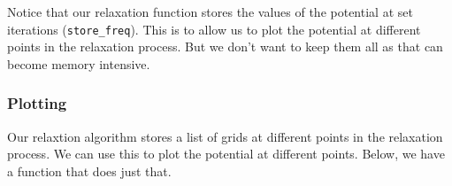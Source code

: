 Notice that our relaxation function stores the values of the potential
at set iterations (\texttt{store\_freq}). This is to allow us to plot
the potential at different points in the relaxation process. But we
don't want to keep them all as that can become memory intensive.

\begin{Shaded}
\begin{Highlighting}[]

\OperatorTok{=}\NormalTok{):}
\OperatorTok{=}\NormalTok{ []}
    
     
         \NormalTok{(}\NormalTok{, }\OperatorTok{{-}}\NormalTok{):}
\OperatorTok{=}  \OperatorTok{*}\NormalTok{ (grid[j}\OperatorTok{{-}}\NormalTok{] }\OperatorTok{+}\NormalTok{ grid[j}\OperatorTok{+}\NormalTok{])}
        
        \OperatorTok{\%}\OperatorTok{==} \NormalTok{:}
    
\end{Highlighting}
\end{Shaded}

\subsubsection{Plotting}\label{plotting}

Our relaxtion algorithm stores a list of grids at different points in
the relaxation process. We can use this to plot the potential at
different points. Below, we have a function that does just that.

